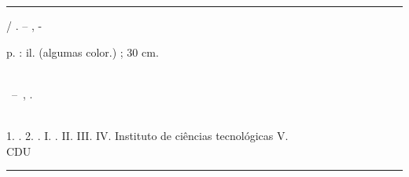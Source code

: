 \begin{fichacatalografica}
	\vspace*{\fill}					%
	\hrule							%
	\begin{center}					%
	\begin{minipage}[c]{12.5cm}		%
	
	\imprimirautor
	
	\hspace{0.5cm} \imprimirtitulo  / \imprimirautor. --
	\imprimirlocal, \imprimirdata-
	
	\hspace{0.5cm} \pageref{LastPage} p. : il. (algumas color.) ; 30 cm.\\
	
	\hspace{0.5cm} \imprimirorientadorRotulo~\imprimirorientador\\
	
	\hspace{0.5cm}
	\parbox[t]{\textwidth}{\imprimirtipotrabalho~--~\imprimirinstituicao,
	\imprimirdata.}\\
	
	\hspace{0.5cm}
		1. \imprimirpalavrachaveum.
		2. \imprimirpalavrachavedois.
		I. \imprimirorientador.
		II. \imprimircoorientador
		III. \imprimirinstituicao
        IV. Instituto de ciências tecnológicas
		V. \imprimirtitulo\\ 			
	
	\hspace{8.75cm} CDU \nomecdu\\
	
	\end{minipage}
	\end{center}
	\hrule
\end{fichacatalografica}
